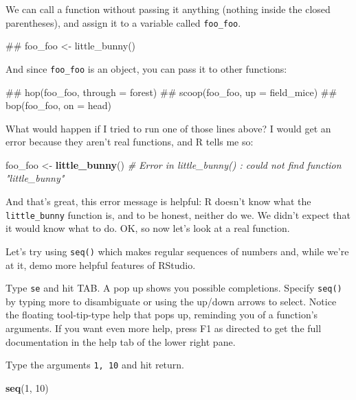 \documentclass[]{book}
\newenvironment{Shaded}{\begin{snugshade}}{\end{snugshade}}
\newcommand{\KeywordTok}[1]{\textcolor[rgb]{0.13,0.29,0.53}{\textbf{{#1}}}}
\newcommand{\DecValTok}[1]{\textcolor[rgb]{0.00,0.00,0.81}{{#1}}}
\newcommand{\StringTok}[1]{\textcolor[rgb]{0.31,0.60,0.02}{{#1}}}
\newcommand{\CommentTok}[1]{\textcolor[rgb]{0.56,0.35,0.01}{\textit{{#1}}}}
\newcommand{\NormalTok}[1]{{#1}}
\theoremstyle{definition}
\theoremstyle{definition}
\theoremstyle{definition}
\theoremstyle{remark}
\begin{document}
We can call a function without passing it anything (nothing inside the
closed parentheses), and assign it to a variable called
\texttt{foo\_foo}.

\begin{Shaded}
\begin{Highlighting}[]
\NormalTok{## foo_foo <- little_bunny()}
\end{Highlighting}
\end{Shaded}

And since \texttt{foo\_foo} is an object, you can pass it to other
functions:

\begin{Shaded}
\begin{Highlighting}[]
\NormalTok{## hop(foo_foo, through = forest) }
\NormalTok{## scoop(foo_foo, up = field_mice) }
\NormalTok{## bop(foo_foo, on = head)}
\end{Highlighting}
\end{Shaded}

What would happen if I tried to run one of those lines above? I would
get an error because they aren't real functions, and R tells me so:

\begin{Shaded}
\begin{Highlighting}[]
\NormalTok{foo_foo <-}\StringTok{ }\KeywordTok{little_bunny}\NormalTok{()}
\CommentTok{# Error in little_bunny() : could not find function "little_bunny"}
\end{Highlighting}
\end{Shaded}

And that's great, this error message is helpful: R doesn't know what the
\texttt{little\_bunny} function is, and to be honest, neither do we. We
didn't expect that it would know what to do. OK, so now let's look at a
real function.

Let's try using \texttt{seq()} which makes regular sequences of numbers
and, while we're at it, demo more helpful features of RStudio.

Type \texttt{se} and hit TAB. A pop up shows you possible completions.
Specify \texttt{seq()} by typing more to disambiguate or using the
up/down arrows to select. Notice the floating tool-tip-type help that
pops up, reminding you of a function's arguments. If you want even more
help, press F1 as directed to get the full documentation in the help tab
of the lower right pane.

Type the arguments \texttt{1,\ 10} and hit return.

\begin{Shaded}
\begin{Highlighting}[]
\KeywordTok{seq}\NormalTok{(}\DecValTok{1}\NormalTok{, }\DecValTok{10}\NormalTok{)}
\end{Highlighting}
\end{Shaded}
\end{document}
